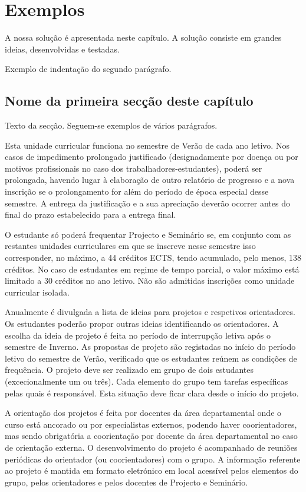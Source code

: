 \chapter{Exemplos} \label{cap:exemplos}

A nossa solução é apresentada neste capítulo. A solução consiste em grandes ideias, desenvolvidas e testadas.

Exemplo de indentação do segundo parágrafo.

\section{Nome da primeira secção deste capítulo} \label{sec31}
Texto da secção. Seguem-se exemplos de vários parágrafos.

Esta unidade curricular funciona no semestre de Verão de cada ano letivo. Nos casos de impedimento prolongado justificado (designadamente por doença ou por motivos profissionais no caso dos trabalhadores-estudantes), poderá ser prolongada, havendo lugar à elaboração de outro relatório de progresso
e a nova inscrição se o prolongamento for além do período de época especial desse semestre. A entrega da justificação e a sua apreciação deverão ocorrer antes do final do prazo estabelecido para a entrega final.

O estudante só poderá frequentar Projecto e Seminário se, em conjunto com as restantes unidades curriculares em que se inscreve nesse semestre isso corresponder, no máximo, a 44 créditos ECTS, tendo acumulado, pelo menos, 138 créditos. No caso de estudantes em regime de tempo parcial, o valor máximo
está limitado a 30 créditos no ano letivo. Não são admitidas inscrições como unidade curricular isolada.

Anualmente é divulgada a lista de ideias para projetos e respetivos orientadores. Os estudantes poderão propor outras ideias identificando os orientadores. A escolha da ideia de projeto é feita no período de
interrupção letiva após o semestre de Inverno. As propostas de projeto são registadas no início do período letivo do semestre de Verão, verificado que os estudantes reúnem as condições de frequência.
O projeto deve ser realizado em grupo de dois estudantes (excecionalmente um ou três). Cada elemento do grupo tem tarefas específicas pelas quais é responsável. Esta situação deve ficar clara desde o início do projeto.

A orientação dos projetos é feita por docentes da área departamental onde o curso está ancorado ou por especialistas externos, podendo haver coorientadores, mas sendo obrigatória a coorientação por docente da área departamental no caso de orientação externa. O desenvolvimento do projeto é acompanhado de reuniões periódicas do orientador (ou coorientadores) com o grupo. A informação referente ao projeto é mantida em formato eletrónico em local acessível pelos elementos do grupo, pelos orientadores e pelos docentes de Projecto e Seminário.\\

